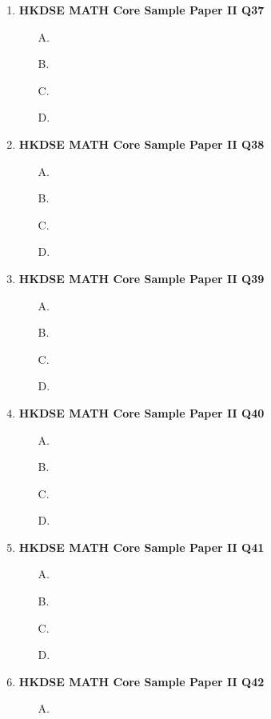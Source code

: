 \documentclass[12pt]{article}
\begin{document}
\begin{enumerate}
\begin{enumerate}
		\item[D.]
	\end{enumerate}
	\item \textbf{HKDSE MATH Core Sample Paper II Q37}\\
	\begin{enumerate}
		\item[A.]
		\item[B.]
		\item[C.]
		\item[D.]
	\end{enumerate}
	\item \textbf{HKDSE MATH Core Sample Paper II Q38}\\
	\begin{enumerate}
		\item[A.]
		\item[B.]
		\item[C.]
		\item[D.]
	\end{enumerate}
	\item \textbf{HKDSE MATH Core Sample Paper II Q39}\\
	\begin{enumerate}
		\item[A.]
		\item[B.]
		\item[C.]
		\item[D.]
	\end{enumerate}
	\item \textbf{HKDSE MATH Core Sample Paper II Q40}\\
	\begin{enumerate}
		\item[A.]
		\item[B.]
		\item[C.]
		\item[D.]
	\end{enumerate}
	\item \textbf{HKDSE MATH Core Sample Paper II Q41}\\
	\begin{enumerate}
		\item[A.]
		\item[B.]
		\item[C.]
		\item[D.]
	\end{enumerate}
	\item \textbf{HKDSE MATH Core Sample Paper II Q42}\\
	\begin{enumerate}
		\item[A.]

\end{enumerate}
\end{enumerate}
\end{document}
